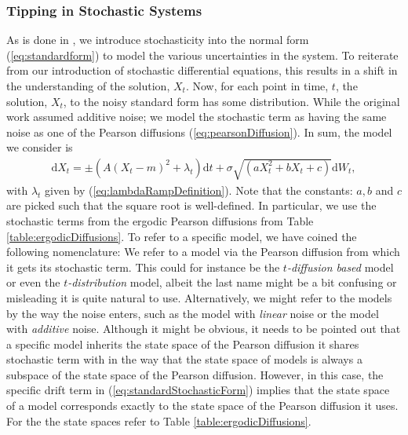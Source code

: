 \subsubsection{Tipping in Stochastic Systems}
As is done in \cite[equation (1)]{Ditlevsen2023}, we introduce stochasticity into the normal form (\ref{eq:standardform}) to model the various uncertainties in the system. To reiterate from our introduction of stochastic differential equations, this results in a shift in the understanding of the solution, $X_t$. Now, for each point in time, $t$, the solution, $X_t$, to the noisy standard form has some distribution. While the original work assumed additive noise; we model the stochastic term as having the same noise as one of the Pearson diffusions (\ref{eq:pearsonDiffusion}). In sum, the model we consider is
\begin{align}
    \mathrm{d}X_t = \pm\left(A\left(X_t - m\right)^2 + \lambda_t\right)\mathrm{d}t + \sigma\sqrt{\left(aX_t^2 + bX_t + c\right)}\mathrm{d}W_t, \label{eq:standardStochasticForm}
\end{align}
with $\lambda_t$ given by (\ref{eq:lambdaRampDefinition}). Note that the constants: $a, b$ and $c$ are picked such that the square root is well-defined. In particular, we use the stochastic terms from the ergodic Pearson diffusions from Table \ref{table:ergodicDiffusions}. To refer to a specific model, we have coined the following nomenclature: We refer to a model via the Pearson diffusion from which it gets its stochastic term. This could for instance be the \textit{$t$-diffusion based} model or even the \textit{$t$-distribution} model, albeit the last name might be a bit confusing or misleading it is quite natural to use. Alternatively, we might refer to the models by the way the noise enters, such as the model with \textit{linear} noise or the model with \textit{additive} noise. Although it might be obvious, it needs to be pointed out that a specific model inherits the state space of the Pearson diffusion it shares stochastic term with in the way that the state space of models is always a subspace of the state space of the Pearson diffusion. However, in this case, the specific drift term in (\ref{eq:standardStochasticForm}) implies that the state space of a model corresponds exactly to the state space of the Pearson diffusion it uses. For the the state spaces refer to Table \ref{table:ergodicDiffusions}.\\\\
